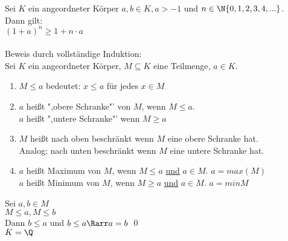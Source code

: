 	Sei $K$ ein angeordneter Körper $a, b \in K, a > -1$ und $n \in \N \{0, 1, 2, 3, 4, ...\}$.\\
	Dann gilt:\\
	$(1 + a)^n \geq 1 + n \cdot a$\\
	\\
	Beweis durch vollständige Induktion:\\
	Sei $K$ ein angeordneter Körper, $M \subseteq K$ eine Teilmenge, $a \in K$.\\
	\begin{enumerate}
	\item{$M \leq a$ bedeutet: $x \leq a$ für jedes $x \in M$}
	\item{$a$ heißt ",obere Schranke"' von $M$, wenn $M \leq a$.\\
		$a$ heißt ",untere Schranke"' wenn $M \geq a$}
	\item{$M$ heißt nach oben beschränkt wenn $M$ eine obere Schranke hat.\\
	Analog: nach unten beschränkt wenn $M$ eine untere Schranke hat.}
	\item{$a$ heißt Maximum von $M$, wenn $M \leq a$ \underline{und} $a \in M$. $a = max(M)$\\
		$a$ heißt Minimum von $M$, wenn $M \geq a$ \underline{und} $a \in M$. $a = min{M}$}
	\end{enumerate}
\bew
	Sei $a, b \in M$\\
	$M \leq a, M \leq b$\\
	Dann $b \leq a$ und $b \leq a \Rarr a = b$ \qed\\
\bsp
	$K = \Q$

